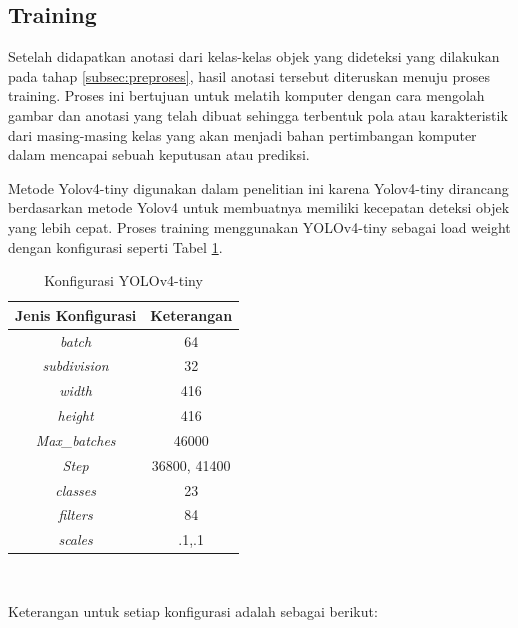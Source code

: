 \subsection{Training}
\label{subsec: Training}
Setelah didapatkan anotasi dari kelas-kelas objek yang dideteksi yang dilakukan pada tahap \ref{subsec:preproses}, hasil anotasi tersebut diteruskan menuju proses training. Proses ini bertujuan untuk melatih komputer dengan cara mengolah gambar dan anotasi yang telah dibuat sehingga terbentuk pola atau karakteristik dari masing-masing kelas yang akan menjadi bahan pertimbangan komputer dalam mencapai sebuah keputusan atau prediksi. 

Metode Yolov4-tiny digunakan dalam penelitian ini karena Yolov4-tiny dirancang berdasarkan metode Yolov4 untuk membuatnya memiliki kecepatan deteksi objek yang lebih cepat. Proses training menggunakan YOLOv4-tiny sebagai load weight dengan konfigurasi seperti Tabel \ref{tab:konfigyolo}. 
\begin{table}[H]
	\centering
	\caption{Konfigurasi YOLOv4-tiny}
	\begin{tabular}{|c|c|}
		\toprule
		Jenis Konfigurasi & Keterangan \\
		\midrule
		\textit{batch} & 64 \\  
		\midrule
		\textit{subdivision} & 32 \\
		\midrule
		\textit{width} & 416 \\
		\midrule
		\textit{height} & 416 \\
		\midrule
		\textit{Max\_batches} & 46000 \\
		\midrule
		\textit{Step} & 36800, 41400 \\
		\midrule
		\textit{classes} & 23 \\
		\midrule
		\textit{filters} & 84 \\
		\midrule
		\textit{scales} & .1,.1 \\
		\bottomrule
	\end{tabular}
	\label{tab:konfigyolo}\
\end{table}
Keterangan untuk setiap konfigurasi adalah sebagai berikut:
